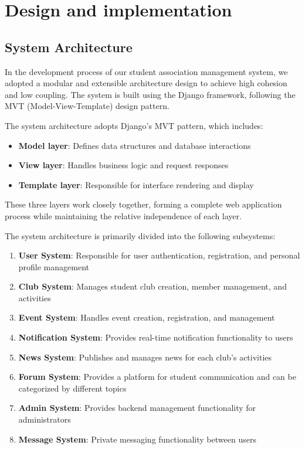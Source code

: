 \chapter{Design and implementation}
\label{chap:design-and-implementation}

\section{System Architecture}

In the development process of our student association management system, we adopted a modular and extensible architecture design to achieve high cohesion and low coupling. The system is built using the Django framework, following the MVT (Model-View-Template) design pattern.

The system architecture adopts Django's MVT pattern, which includes:
\begin{itemize}
    \item \textbf{Model layer}: Defines data structures and database interactions
    \item \textbf{View layer}: Handles business logic and request responses
    \item \textbf{Template layer}: Responsible for interface rendering and display
\end{itemize}

These three layers work closely together, forming a complete web application process while maintaining the relative independence of each layer.

The system architecture is primarily divided into the following subsystems:

\begin{enumerate}
    \item \textbf{User System}: Responsible for user authentication, registration, and personal profile management
    \item \textbf{Club System}: Manages student club creation, member management, and activities
    \item \textbf{Event System}: Handles event creation, registration, and management
    \item \textbf{Notification System}: Provides real-time notification functionality to users
    \item \textbf{News System}: Publishes and manages news for each club's activities
    \item \textbf{Forum System}: Provides a platform for student communication and can be categorized by different topics
    \item \textbf{Admin System}: Provides backend management functionality for administrators
    \item \textbf{Message System}: Private messaging functionality between users
\end{enumerate}

